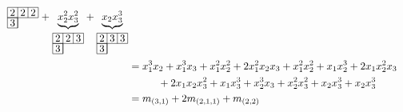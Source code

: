 \begin{align*}
{\begin{tikzpicture}[scale=0.35, baseline=-0.5ex]
    \draw (0,0) rectangle (3,1);
    \draw (0,-1) rectangle (1,0);
    \draw (1,-1)--(1,1);
    \draw (2,0)--(2,1);
    \node at (0.5,0.5) {$2$};  \node at (1.5,0.5) {$2$}; \node at (2.5,0.5) {$2$};
    \node at (0.5,-0.5) {$3$};
  \end{tikzpicture}
  }
  +
  \underbrace{x_2^2x_3^2}_{
  \begin{tikzpicture}[scale=0.35, baseline=-0.5ex]
    \draw (0,0) rectangle (3,1);
    \draw (0,-1) rectangle (1,0);
    \draw (1,-1)--(1,1);
    \draw (2,0)--(2,1);
    \node at (0.5,0.5) {$2$};  \node at (1.5,0.5) {$2$}; \node at (2.5,0.5) {$3$};
    \node at (0.5,-0.5) {$3$};
  \end{tikzpicture}
  }
  +
  \underbrace{x_2x_3^3}_{
  \begin{tikzpicture}[scale=0.35, baseline=-0.5ex]
    \draw (0,0) rectangle (3,1);
    \draw (0,-1) rectangle (1,0);
    \draw (1,-1)--(1,1);
    \draw (2,0)--(2,1);
    \node at (0.5,0.5) {$2$};  \node at (1.5,0.5) {$3$}; \node at (2.5,0.5) {$3$};
    \node at (0.5,-0.5) {$3$};
  \end{tikzpicture}
  }
  \\
  &= x_1^3x_2 + x_1^3x_3 + x_1^2x_2^2 + 2x_1^2x_2x_3 + x_1^2x_2^2 + x_1x_2^3 + 2x_1x_2^2x_3 \\
  &\hspace{1cm}+ 2x_1x_2x_3^2 + x_1x_3^3 + x_2^3x_3 + x_2^2x_3^2 + x_2x_3^3 + x_2x_3^3 \\
  &= m_{(3,1)} + 2m_{(2,1,1)} + m_{(2,2)}
\end{align*}